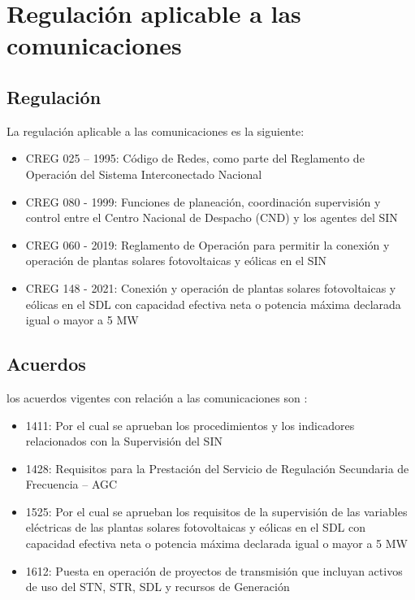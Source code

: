 \documentclass[a5paper]{book}%
\begin{document}
\section{Regulación aplicable a las comunicaciones}

\subsection{Regulación}
La regulación aplicable a las comunicaciones es la siguiente:

\begin{itemize}
\item CREG 025 – 1995: Código de Redes, como parte del Reglamento de Operación del Sistema Interconectado Nacional
\item CREG 080 - 1999: Funciones de planeación, coordinación supervisión y control entre el Centro Nacional de Despacho (CND) y los agentes del SIN
\item CREG 060 - 2019: Reglamento de Operación para permitir la conexión y operación de plantas solares fotovoltaicas y eólicas en el SIN
\item CREG 148 - 2021: Conexión y operación de plantas solares fotovoltaicas y eólicas en el SDL con capacidad efectiva neta o potencia máxima declarada igual o mayor a 5 MW
\end{itemize}

\subsection{Acuerdos}

los acuerdos vigentes con relación a las comunicaciones son :

\begin{itemize}
\item 1411: Por el cual se aprueban los procedimientos y los indicadores relacionados con la Supervisión del SIN
\item 1428: Requisitos para la Prestación del Servicio de Regulación Secundaria de Frecuencia – AGC
\item 1525: Por el cual se aprueban los requisitos de la supervisión de las variables eléctricas de las plantas solares fotovoltaicas y eólicas en el SDL con capacidad efectiva neta o potencia máxima declarada igual o mayor a 5 MW
\item 1612: Puesta en operación de proyectos de transmisión que incluyan activos de uso del STN, STR, SDL y recursos de Generación
  \end{itemize}
\end{document}

